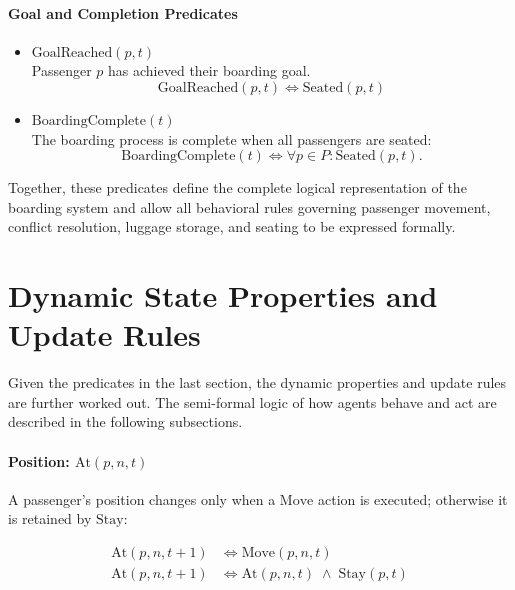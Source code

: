 \documentclass[11pt,a4paper]{article}
\begin{document}
\paragraph{Goal and Completion Predicates}

\begin{itemize}

\item $\text{GoalReached}(p,t)$\\
Passenger $p$ has achieved their boarding goal.
\[
\text{GoalReached}(p,t) \iff \text{Seated}(p,t)
\]

\item $\text{BoardingComplete}(t)$\\
The boarding process is complete when all passengers are seated:
\[
\text{BoardingComplete}(t) \iff \forall p \in P : \text{Seated}(p,t).
\]

\end{itemize}

Together, these predicates define the complete logical representation of the boarding system and allow all behavioral rules governing passenger movement, conflict resolution, luggage storage, and seating to be expressed formally.

\section{Dynamic State Properties and Update Rules}

Given the predicates in the last section, the dynamic properties and update rules are further worked out. The semi-formal logic of how agents behave and act are described in the following subsections.

\paragraph{Position: $\text{At}(p,n,t)$}

A passenger's position changes only when a $\text{Move}$ action is executed;
otherwise it is retained by $\text{Stay}$:

\begin{align}
  \text{At}(p,n,t{+}1) &\iff \text{Move}(p,n,t) \label{eq:at-move}\\
  \text{At}(p,n,t{+}1) &\iff \text{At}(p,n,t) \;\wedge\; \text{Stay}(p,t) \label{eq:at-stay}
\end{align}
\end{document}
